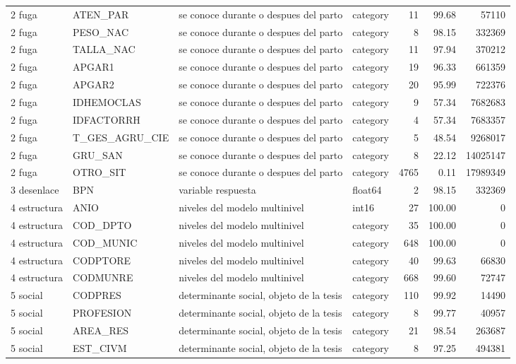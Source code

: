 \begin{tabular}{llllrrr}
2 fuga & ATEN\_PAR & se conoce durante o despues del parto & category & 11 & 99.68 & 57110 \\
2 fuga & PESO\_NAC & se conoce durante o despues del parto & category & 8 & 98.15 & 332369 \\
2 fuga & TALLA\_NAC & se conoce durante o despues del parto & category & 11 & 97.94 & 370212 \\
2 fuga & APGAR1 & se conoce durante o despues del parto & category & 19 & 96.33 & 661359 \\
2 fuga & APGAR2 & se conoce durante o despues del parto & category & 20 & 95.99 & 722376 \\
2 fuga & IDHEMOCLAS & se conoce durante o despues del parto & category & 9 & 57.34 & 7682683 \\
2 fuga & IDFACTORRH & se conoce durante o despues del parto & category & 4 & 57.34 & 7683357 \\
2 fuga & T\_GES\_AGRU\_CIE & se conoce durante o despues del parto & category & 5 & 48.54 & 9268017 \\
2 fuga & GRU\_SAN & se conoce durante o despues del parto & category & 8 & 22.12 & 14025147 \\
2 fuga & OTRO\_SIT & se conoce durante o despues del parto & category & 4765 & 0.11 & 17989349 \\
3 desenlace & BPN & variable respuesta & float64 & 2 & 98.15 & 332369 \\
4 estructura & ANIO & niveles del modelo multinivel & int16 & 27 & 100.00 & 0 \\
4 estructura & COD\_DPTO & niveles del modelo multinivel & category & 35 & 100.00 & 0 \\
4 estructura & COD\_MUNIC & niveles del modelo multinivel & category & 648 & 100.00 & 0 \\
4 estructura & CODPTORE & niveles del modelo multinivel & category & 40 & 99.63 & 66830 \\
4 estructura & CODMUNRE & niveles del modelo multinivel & category & 668 & 99.60 & 72747 \\
5 social & CODPRES & determinante social, objeto de la tesis & category & 110 & 99.92 & 14490 \\
5 social & PROFESION & determinante social, objeto de la tesis & category & 8 & 99.77 & 40957 \\
5 social & AREA\_RES & determinante social, objeto de la tesis & category & 21 & 98.54 & 263687 \\
5 social & EST\_CIVM & determinante social, objeto de la tesis & category & 8 & 97.25 & 494381 \\

\end{tabular}
